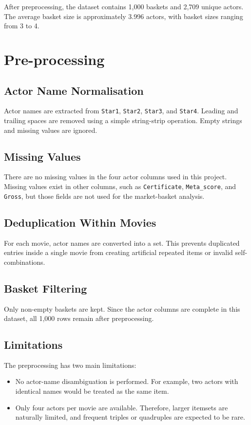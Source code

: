 \documentclass[11pt,a4paper]{article}
\begin{document}
After preprocessing, the dataset contains 1,000 baskets and 2,709 unique actors. The average basket size is approximately 3.996 actors, with basket sizes ranging from 3 to 4.

\section{Pre-processing}

\subsection{Actor Name Normalisation}
Actor names are extracted from \texttt{Star1}, \texttt{Star2}, \texttt{Star3}, and \texttt{Star4}. Leading and trailing spaces are removed using a simple string-strip operation. Empty strings and missing values are ignored.

\subsection{Missing Values}
There are no missing values in the four actor columns used in this project. Missing values exist in other columns, such as \texttt{Certificate}, \texttt{Meta\_score}, and \texttt{Gross}, but those fields are not used for the market-basket analysis.

\subsection{Deduplication Within Movies}
For each movie, actor names are converted into a set. This prevents duplicated entries inside a single movie from creating artificial repeated items or invalid self-combinations.

\subsection{Basket Filtering}
Only non-empty baskets are kept. Since the actor columns are complete in this dataset, all 1,000 rows remain after preprocessing.

\subsection{Limitations}
The preprocessing has two main limitations:
\begin{itemize}[leftmargin=*]
    \item No actor-name disambiguation is performed. For example, two actors with identical names would be treated as the same item.
    \item Only four actors per movie are available. Therefore, larger itemsets are naturally limited, and frequent triples or quadruples are expected to be rare.
\end{itemize}
\end{document}
